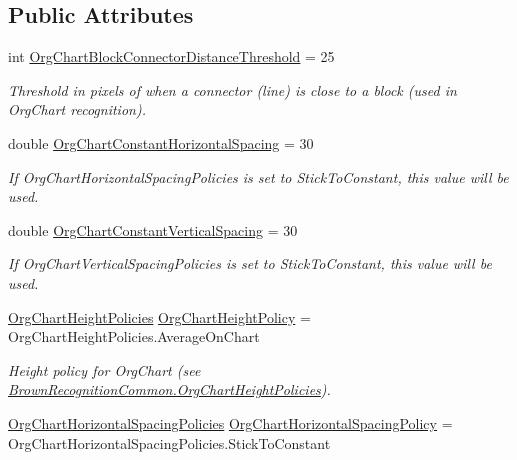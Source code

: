 \subsection*{\-Public \-Attributes}
\begin{DoxyCompactItemize}
\item 
int \hyperlink{class_brown_recognition_common_1_1_brown_recognition_settings_afb1494bf5bc116f8ae985c4505363610}{\-Org\-Chart\-Block\-Connector\-Distance\-Threshold} = 25
\begin{DoxyCompactList}\small\item\em \-Threshold in pixels of when a connector (line) is close to a block (used in \-Org\-Chart recognition). \end{DoxyCompactList}\item 
double \hyperlink{class_brown_recognition_common_1_1_brown_recognition_settings_ac6a25e18980dbe6b3317e7402b716e73}{\-Org\-Chart\-Constant\-Horizontal\-Spacing} = 30
\begin{DoxyCompactList}\small\item\em \-If \-Org\-Chart\-Horizontal\-Spacing\-Policies is set to \-Stick\-To\-Constant, this value will be used. \end{DoxyCompactList}\item 
double \hyperlink{class_brown_recognition_common_1_1_brown_recognition_settings_ae738ae766d57146daa5860d449980be8}{\-Org\-Chart\-Constant\-Vertical\-Spacing} = 30
\begin{DoxyCompactList}\small\item\em \-If \-Org\-Chart\-Vertical\-Spacing\-Policies is set to \-Stick\-To\-Constant, this value will be used. \end{DoxyCompactList}\item 
\hyperlink{namespace_brown_recognition_common_ad4408ca473997d3ec1b071e5f5c4573f}{\-Org\-Chart\-Height\-Policies} \hyperlink{class_brown_recognition_common_1_1_brown_recognition_settings_a0bf36fd3829ccf9bc8a3a1f2b89e394d}{\-Org\-Chart\-Height\-Policy} = \-Org\-Chart\-Height\-Policies.\-Average\-On\-Chart
\begin{DoxyCompactList}\small\item\em \-Height policy for \-Org\-Chart (see \hyperlink{namespace_brown_recognition_common_ad4408ca473997d3ec1b071e5f5c4573f}{\-Brown\-Recognition\-Common.\-Org\-Chart\-Height\-Policies}). \end{DoxyCompactList}\item 
\hyperlink{namespace_brown_recognition_common_ac84ab02b07772204f06e83ed86500823}{\-Org\-Chart\-Horizontal\-Spacing\-Policies} \hyperlink{class_brown_recognition_common_1_1_brown_recognition_settings_ae7204143c981a3b876b8f448e9d09f68}{\-Org\-Chart\-Horizontal\-Spacing\-Policy} = \-Org\-Chart\-Horizontal\-Spacing\-Policies.\-Stick\-To\-Constant

\end{DoxyCompactItemize}
